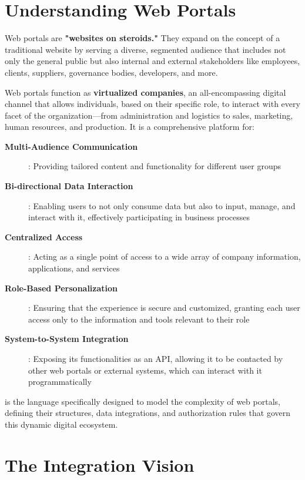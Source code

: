 \section{Understanding Web Portals}
\label{sec:web-portals}

Web portals are \textbf{"websites on steroids."} They expand on the concept of a traditional website by serving a diverse, segmented audience that includes not only the general public but also internal and external stakeholders like employees, clients, suppliers, governance bodies, developers, and more.

Web portals function as \textbf{virtualized companies}, an all-encompassing digital channel that allows individuals, based on their specific role, to interact with every facet of the organization—from administration and logistics to sales, marketing, human resources, and production. It is a comprehensive platform for:

\begin{description}
\item[\textbf{Multi-Audience Communication}]: Providing tailored content and functionality for different user groups
\item[\textbf{Bi-directional Data Interaction}]: Enabling users to not only consume data but also to input, manage, and interact with it, effectively participating in business processes
\item[\textbf{Centralized Access}]: Acting as a single point of access to a wide array of company information, applications, and services
\item[\textbf{Role-Based Personalization}]: Ensuring that the experience is secure and customized, granting each user access only to the information and tools relevant to their role
\item[\textbf{System-to-System Integration}]: Exposing its functionalities as an API, allowing it to be contacted by other web portals or external systems, which can interact with it programmatically
\end{description}

\wbdl{} is the language specifically designed to model the complexity of web portals, defining their structures, data integrations, and authorization rules that govern this dynamic digital ecosystem.

\section{The Integration Vision}
\label{sec:integration-vision}

